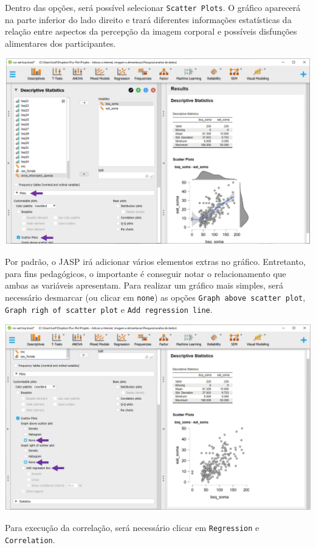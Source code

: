 \documentclass[
]{book}
\begin{document}
Dentro das opções, será possível selecionar \texttt{Scatter\ Plots}. O
gráfico aparecerá na parte inferior do lado direito e trará diferentes
informações estatísticas da relação entre aspectos da percepção da
imagem corporal e possíveis disfunções alimentares dos participantes.

\includegraphics{./img/cap_correlacao_grafico_dispersao.png}

Por padrão, o JASP irá adicionar vários elementos extras no gráfico.
Entretanto, para fins pedagógicos, o importante é conseguir notar o
relacionamento que ambas as variáveis apresentam. Para realizar um
gráfico mais simples, será necessário desmarcar (ou clicar em
\texttt{none}) as opções \texttt{Graph\ above\ scatter\ plot},
\texttt{Graph\ righ\ of\ scatter\ plot} e
\texttt{Add\ regression\ line}.

\includegraphics{./img/cap_correlacao_grafico_dispersao2.png}

Para execução da correlação, será necessário clicar em
\texttt{Regression} e \texttt{Correlation}.
\end{document}
